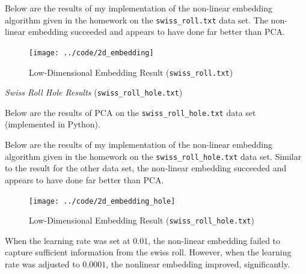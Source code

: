 \documentclass[twoside,11pt]{homework}
\DeclarePairedDelimiter{\2norm}{\lVert}{\rVert^2_2}
\newcommand{\1}[1]{\mathds{1}\left[#1\right]}
\begin{document}
\begin{enumerate}[(i)]
Below are the results of my implementation of the non-linear embedding algorithm given in the homework on the \texttt{swiss\_roll.txt} data set. The non-linear embedding succeeded and appears to have done far better than PCA.

\begin{figure}[H]
\centering
\caption{Low-Dimensional Embedding Result (\texttt{swiss\_roll.txt})}
\texttt{[image: ../code/2d\_embedding]}
\end{figure}

\textit{Swiss Roll Hole Results} (\texttt{swiss\_roll\_hole.txt})

 Below are the results of PCA on the \texttt{swiss\_roll\_hole.txt} data set (implemented in Python).
 
\begin{figure}[H]
\centering
{}
\noindent
\end{figure}


Below are the results of my implementation of the non-linear embedding algorithm given in the homework on the \texttt{swiss\_roll\_hole.txt} data set. Similar to the result for the other data set, the non-linear embedding succeeded and appears to have done far better than PCA.

\begin{figure}[H]
\centering
\caption{Low-Dimensional Embedding Result (\texttt{swiss\_roll\_hole.txt})}
\texttt{[image: ../code/2d\_embedding\_hole]}
\end{figure}


When the learning rate was set at $0.01$, the non-linear embedding failed to capture sufficient information from the  swiss roll. However, when the learning rate was adjusted to $0.0001$, the nonlinear embedding improved,  significantly.
\end{enumerate}
\end{document}
